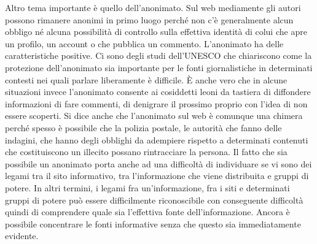 Altro tema importante è quello dell'anonimato. Sul web mediamente gli autori possono rimanere anonimi in primo luogo perché non c'è generalmente alcun obbligo né alcuna possibilità di controllo sulla effettiva identità di colui che apre un profilo, un account o che pubblica un commento. 
L'anonimato ha delle caratteristiche positive. Ci sono degli studi dell'UNESCO che chiariscono come la protezione dell'anonimato sia importante per le fonti giornalistiche in determinati contesti nei quali parlare liberamente è difficile. 
È anche vero che in alcune situazioni invece l'anonimato consente ai cosiddetti leoni da tastiera di diffondere informazioni di fare commenti, di denigrare il prossimo proprio con l'idea di non essere scoperti. 
Si dice anche che l'anonimato sul web è comunque una chimera perché spesso è possibile che la polizia postale, le autorità che fanno delle indagini, che hanno degli obblighi da adempiere rispetto a determinati contenuti che costituiscono un illecito possano rintracciare la persona.
Il fatto che sia possibile un anonimato porta anche ad una difficoltà di individuare se vi sono dei legami tra il sito informativo, tra l'informazione che viene distribuita e gruppi di potere. In altri termini, i legami fra un'informazione, fra i siti e determinati gruppi di potere può essere difficilmente riconoscibile con conseguente difficoltà quindi di comprendere quale sia l'effettiva fonte dell'informazione.
Ancora è possibile concentrare le fonti informative senza che questo sia immediatamente evidente.

